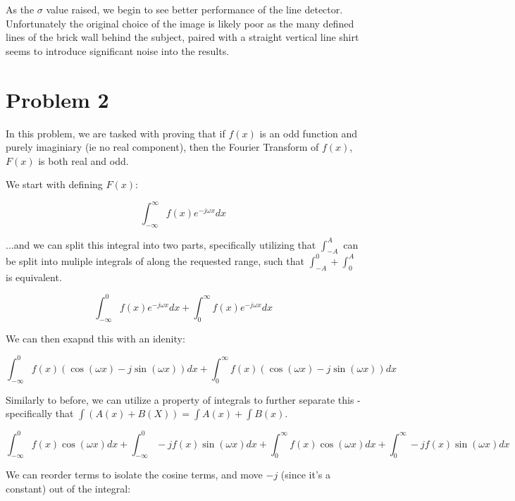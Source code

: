 \documentclass{article}
\begin{document}
As the $\sigma$ value raised, we begin to see better performance of the line detector. Unfortunately the original choice of the image is likely poor as the many defined lines of the brick wall behind the subject, paired with a straight vertical line shirt seems to introduce significant noise into the results.

\section*{Problem 2}

In this problem, we are tasked with proving that if $f(x)$ is an odd function and purely imaginiary (ie no real component), then the Fourier Transform of $f(x)$, $F(x)$ is both real and odd.

We start with defining $F(x)$:

\begin{equation}
    \int_{-\infty}^{\infty} f(x)e^{-j \omega x} dx
\end{equation}

\noindent ...and we can split this integral into two parts, specifically utilizing that $\int_{-A}^{A}$ can be split into muliple integrals of along the requested range, such that $\int_{-A}^0 + \int_0^A$ is equivalent.

\begin{equation}
    \int_{-\infty}^{0} f(x)e^{-j \omega x} dx + \int_{0}^{\infty} f(x)e^{-j \omega x} dx
\end{equation}

\noindent We can then exapnd this with an idenity:

\begin{equation}
    \int_{-\infty}^{0} f(x)(\cos(\omega x) - j\sin(\omega x)) dx + \int_{0}^{\infty} f(x)(\cos(\omega x) - j\sin(\omega x)) dx
\end{equation}

\noindent Similarly to before, we can utilize a property of integrals to further separate this - specifically that $\int (A(x)+B(X)) = \int A(x) + \int B(x)$.

\begin{equation}
    \int_{-\infty}^{0} f(x)\cos(\omega x) dx + \int_{-\infty}^{0} -j f(x) \sin(\omega x) dx + \int_{0}^{\infty} f(x)\cos(\omega x) dx + \int_{0}^{\infty} -j f(x) \sin(\omega x) dx
\end{equation}

\noindent We can reorder terms to isolate the cosine terms, and move $-j$ (since it's a constant) out of the integral:
\end{document}
